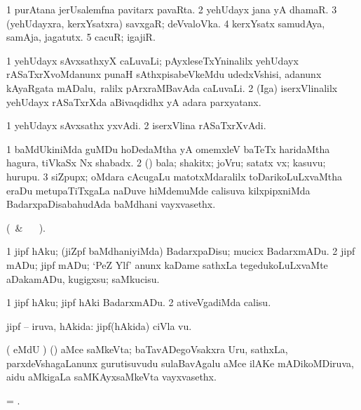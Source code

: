 \bentry
{} 
\gl{\nA} 
\bmng
\bnum
\num{1} purAtana jerUsalemfna pavitarx pavaRta. 
\num{2} yehUdayx jana yA dhamaR. 
\num{3} (yehUdayxra, kerxYsatxra) savxgaR; deVvaloVka.  
\num{4} kerxYsatx samudAya, samAja, jagatutx. 
\num{5} cacuR; igajiR.
\enum
\emng
\eentry

\bentry
{} 
\gl{\nA}
\bmng
\bnum
\num{1} yehUdayx sAvxsathxyX caLuvaLi; pAyxleseTxYninalilx yehUdayx rASaTxrXvoMdanunx punaH sAthxpisabeVkeMdu udedxVshisi, adanunx kAyaRgata mADalu, \,ralilx pArxraMBavAda caLuvaLi. 
\num{2} (Iga) iserxVlinalilx yehUdayx rASaTxrXda aBivaqdidhx  yA adara parxyatanx.
\enum
\emng
\eentry

\bentry
{} 
\gl{\nA} 
\bmng
\bnum
\num{1} yehUdayx sAvxsathx yxvAdi. 
\num{2} iserxVlina rASaTxrXvAdi.
\enum
\emng
\eentry

\bentry
{} 
\gl{\nA} 
\bmng
\bnum
\num{1} baMdUkiniMda  guMDu hoDedaMtha yA omemxleV baTeTx haridaMtha hagura, tiVkaSx Nx shabadx. 
\num{2} (\rUpa) bala; shakitx; joVru; satatx  vx; kasuvu; hurupu.  
\hypertarget{zip(1)3}{}
\num{3} siZpupx; oMdara cAcugaLu matotxMdaralilx toDarikoLuLxvaMtha  eraDu metupaTiTxgaLa naDuve hiMdemuMde calisuva kilxpipxniMda BadarxpaDisabahudAda baMdhani vayxvasethx.
\enum
\emng
\eentry

\bentry
{} 
\gl{\kirx} 
\bmng
(\BU\ \& \BUkaq\   \vakaq\ ).  
\emng

\noindent
\gl{\sakirx} 
\bmng
\bnum
\num{1} jipf hAku; (jiZpf baMdhaniyiMda) BadarxpaDisu; mucicx BadarxmADu. 
\num{2} jipf mADu; jipf mADu; `PeZ Ylf' anunx kaDame sathxLa tegedukoLuLxvaMte aDakamADu, kugigxsu; saMkucisu.
\enum
\emng

\noindent
\gl{\akirx}
\bmng
\bnum
\num{1} jipf hAku; jipf hAki  BadarxmADu. 
\num{2} ativeVgadiMda calisu.
\enum
\emng 
\eentry

\bentry
{} 
\gl{\gu} 
\bmng
jipf -- iruva, hAkida:  jipf(hAkida) ciVla \mo vu.
\emng
\eentry

\bentry
{} 
\gl{\nA}  
\bmng
( eMdU \parx) (\ame) aMce saMkeVta; baTavADegoVsakxra Uru, sathxLa, parxdeVshagaLanunx gurutisuvudu sulaBavAgalu aMce ilAKe mADikoMDiruva, aidu aMkigaLa saMKAyxsaMkeVta vayxvasethx.
\emng
\eentry

\bentry
{} 
\gl{\nA} 
\bmng
= .
\emng
\eentry

